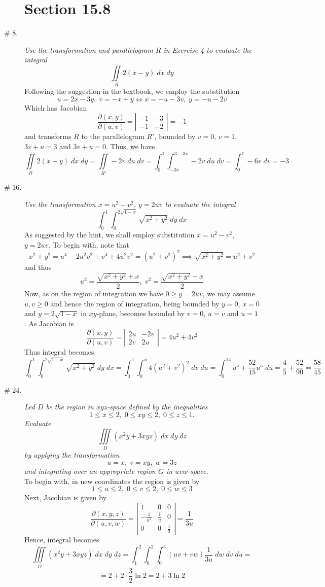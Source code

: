 \documentclass[8pt]{article} %
\newcommand{\dx}{\;dx}
\newcommand{\dy}{\;dy}
\newcommand{\dz}{\;dz}
\newcommand{\du}{\;du}
\newcommand{\dv}{\;dv}
\newcommand{\dw}{\;dw}
\begin{document}
\begin{description}
\section{Section 15.8}
	\item[\# 8.]{{\it Use the transformation and parallelogram $R$ in Exercise 4 to evaluate the integral}
		\[\iint\limits_R2(x-y)\dx\dy\]
		Following the suggestion in the textbook, we employ the substitution
		\[u=2x-3y,\;v=-x+y\iff x=-u-3v,\;y=-u-2v\]
		Which has Jacobian
		\[\frac{\partial(x,y)}{\partial(u,v)}=\left|\begin{array}{ll}-1&-3\\-1&-2\end{array}\right|=-1\]
		and transforms $R$ to the parallelogram $R'$, bounded by $v=0$, $v=1$, $3v+u=3$ and $3v+u=0$. Thus, we have
		\[\iint\limits_R2(x-y)\dx\dy=\iint\limits_{R'}-2v\du\dv=\int_0^1\int_{-3v}^{3-3v}-2v\du\dv=\int_0^1-6v\dv=-3\]
		}
	\item[\# 16.]{{\it Use the transformation $x=u^2-v^2$, $y=2uv$ to evaluate the integral}
		\[\int_0^1\int_0^{2\sqrt{1-x}}\sqrt{x^2+y^2}\dy\dx\]
		As suggested by the hint, we shall employ substitution $x=u^2-v^2$, $y=2uv$. To begin with, note that
		\[x^2+y^2=u^4-2u^2v^2+v^4+4u^2v^2=(u^2+v^2)^2\implies \sqrt{x^2+y^2}=u^2+v^2\]
		and thus
		\[u^2=\frac{\sqrt{x^2+y^2}+x}{2},\;v^2=\frac{\sqrt{x^2+y^2}-x}{2}\]
		Now, as on the region of integration we have $0\geq y=2uv$, we may assume $u,v\geq0$ and hence the region of 
		integration, being bounded by $y=0$, $x=0$ and $y=2\sqrt{1-x}$ in $xy$-plane, becomes bounded by
		$v=0$, $u=v$ and $u=1$. As Jacobian is
		\[\frac{\partial(x,y)}{\partial(u,v)}=\left|\begin{array}{ll}
			2u&-2v\\2v&2u
		\end{array}\right|=4u^2+4v^2\]
		Thus integral becomes
		\[\int_0^1\int_0^{2\sqrt{1-x}}\sqrt{x^2+y^2}\dy\dx=\int_0^1\int_0^u4(u^2+v^2)^2\dv\du=\int_0^14u^4+\frac{52}{15}u^5\du
		=\frac{4}{5}+\frac{52}{90}=\frac{58}{45}\]
		}
	\item[\# 24.]{{\it Led $D$ be the region in $xyz$-space defined by the inequalities
		\[1\leq x\leq2,\;0\leq xy\leq2,\;0\leq z\leq1.\]
		Evaluate
		\[\iiint\limits_D(x^2y+3xyz)\dx\dy\dz\]
		by applying the transformation
		\[u=x,\;v=xy,\;w=3z\]
		and integrating over an appropriate region $G$ in $uvw$-space.\\}
		To begin with, in new coordinates the region is given by
		\[1\leq u\leq2,\;0\leq v\leq 2,\;0\leq w\leq 3\]
		Next, Jacobian is given by
		\[\frac{\partial(x,y,z)}{\partial(u,v,w)}=\left|\begin{array}{lll}
			1&0&0\\-\frac{1}{u^2}&\frac{1}{u}&0\\0&0&\frac{1}{3}
		\end{array}\right|=\frac{1}{3u}\]
		Hence, integral becomes
		\[\iiint\limits_D(x^2y+3xyz)\dx\dy\dz=\int_1^2\int_0^2\int_0^3(uv+vw)\frac{1}{3u}\dw\dv\du=\]
		\[=2+2\cdot\frac{3}{2}\ln2=2+3\ln2\]
		}
\end{description}
\end{document}
